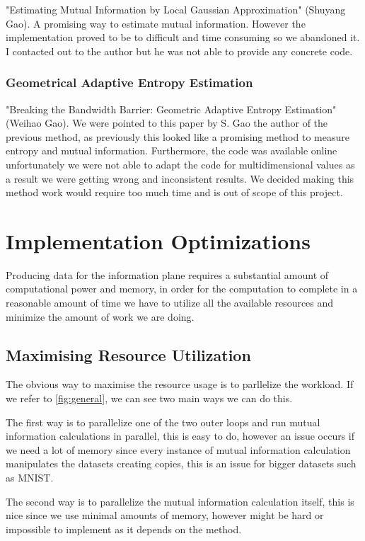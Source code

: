 \documentclass[dissertation.tex]{subfiles}
\begin{document}
  "Estimating Mutual Information by Local Gaussian Approximation" (Shuyang Gao). A
  promising way to estimate mutual information. However the implementation
  proved to be to difficult and time consuming so we abandoned it. I contacted
  out to the author but he was not able to provide any concrete code.

\subsubsection{Geometrical Adaptive Entropy Estimation}

  "Breaking the Bandwidth Barrier: Geometric Adaptive Entropy Estimation"
  (Weihao Gao). We were pointed to this paper by S. Gao the author of the
  previous method, as previously this looked like a promising method to measure
  entropy and mutual information. Furthermore, the code was available online
  unfortunately we were not able to adapt the code for multidimensional values
  as a result we were getting wrong and inconsistent results. We decided making
  this method work would require too much time and is out of scope of this
  project.

\section{Implementation Optimizations}

Producing data for the information plane requires a substantial amount of
computational power and memory, in order for the computation to complete in a
reasonable amount of time we have to utilize all the available resources and
minimize the amount of work we are doing.

\subsection{Maximising Resource Utilization}

The obvious way to maximise the resource usage is to parllelize the workload.
If we refer to \autoref{fig:general}, we can see two main ways we can do this.

The first way is to parallelize one of the two outer loops and run mutual
information calculations in parallel, this is easy to do, however an issue
occurs if we need a lot of memory since every instance of mutual information
calculation manipulates the datasets creating copies, this is an issue for
bigger datasets such as MNIST.

The second way is to parallelize the mutual information calculation itself, this
is nice since we use minimal amounts of memory, however might be hard or
impossible to implement as it depends on the method.
\end{document}
